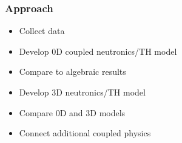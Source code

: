 \begin{frame}[fragile]
  \frametitle{Approach}
  \begin{itemize}
    \item Collect data
    \item Develop 0D coupled neutronics/TH model
    \item Compare to algebraic results
    \item Develop 3D neutronics/TH model
    \item Compare 0D and 3D models
    \item Connect additional coupled physics
  \end{itemize}

\end{frame}

